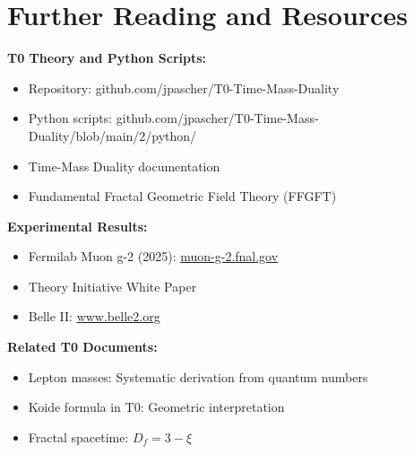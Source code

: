 	\section*{Further Reading and Resources}
	
	\textbf{T0 Theory and Python Scripts:}
	\begin{itemize}
		\item Repository: github.com/jpascher/T0-Time-Mass-Duality
		\item Python scripts: github.com/jpascher/T0-Time-Mass-Duality/blob/main/2/python/
		\item Time-Mass Duality documentation
		\item Fundamental Fractal Geometric Field Theory (FFGFT)
	\end{itemize}
	
	\textbf{Experimental Results:}
	\begin{itemize}
		\item Fermilab Muon g-2 (2025): \href{https://muon-g-2.fnal.gov/}{muon-g-2.fnal.gov}
		\item Theory Initiative White Paper
		\item Belle II: \href{https://www.belle2.org/}{www.belle2.org}
	\end{itemize}
	
	\textbf{Related T0 Documents:}
	\begin{itemize}
		\item Lepton masses: Systematic derivation from quantum numbers
		\item Koide formula in T0: Geometric interpretation
		\item Fractal spacetime: $D_f = 3 - \xi$
	\end{itemize}
	